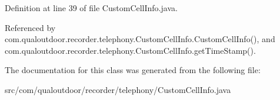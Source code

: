 Definition at line 39 of file Custom\-Cell\-Info.\-java.



Referenced by com.\-qualoutdoor.\-recorder.\-telephony.\-Custom\-Cell\-Info.\-Custom\-Cell\-Info(), and com.\-qualoutdoor.\-recorder.\-telephony.\-Custom\-Cell\-Info.\-get\-Time\-Stamp().



The documentation for this class was generated from the following file\-:\begin{DoxyCompactItemize}
\item 
src/com/qualoutdoor/recorder/telephony/Custom\-Cell\-Info.\-java\end{DoxyCompactItemize}
